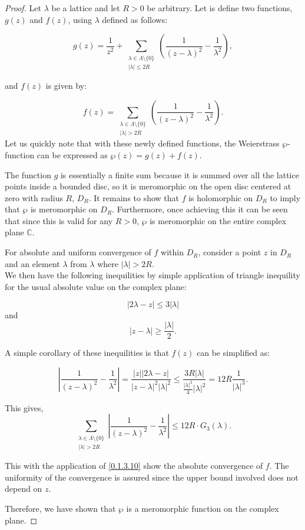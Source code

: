 \begin{proof}

Let $\lambda$ be a lattice and let \( R >0 \) be arbitrary. Let is define two functions, \( g(z) \) and \( f(z) \), using \( \lambda \) defined as follows:

\[
g(z) = \frac{1}{z^2} + \sum_{\substack{\lambda \in \Lambda \setminus \{0\} \\ |\lambda| \leq 2R}} \left( \frac{1}{(z - \lambda)^2} - \frac{1}{\lambda^2} \right),
\]

and \( f(z) \) is given by:

\[
f(z) = \sum_{\substack{\lambda \in \Lambda \setminus \{0\} \\ |\lambda| > 2R}} \left( \frac{1}{(z - \lambda)^2} - \frac{1}{\lambda^2} \right).
\]
Let us quickly note that with these newly defined functions, the Weierstrass \( \wp \)-function can be expressed as \( \wp(z) = g(z) + f(z) \).

The function \( g \) is essentially a finite sum because it is summed over all the lattice points inside a bounded disc, so it is meromorphic on the open disc centered at zero with radius \( R \), \( D_R \).
It remains to show that \( f \) is holomorphic on \( D_R \) to imply that \( \wp \) is meromorphic on \( D_R \). Furthermore, once achieving this it can be seen that since this is valid for any \( R > 0 \), \( \wp \) is meromorphic on the entire complex plane \( \mathbb{C} \).

For absolute and uniform convergence of \( f \) within \( D_R \), consider a point \( z \) in \( D_R \) and an element \( \lambda \) from \( \lambda \) where \( |\lambda| > 2R \). \\

We then have the following inequilities by simple application of triangle inequility for the usual absolute value on the complex plane: 

\[
|2\lambda - z| \leq 3|\lambda|
\]
and
\[
|z - \lambda| \geq \frac{|\lambda|}{2}.
\]

A simple corollary of these inequilities is that \( f(z) \) can be simplified as:

\[
\left|\frac{1}{(z - \lambda)^2} - \frac{1}{\lambda^2}\right| = \frac{|z||2 \lambda - z|}{|z - \lambda|^2|\lambda|^2} \leq \frac{3R|\lambda|}{\frac{|\lambda|^2}{4}|\lambda|^2} = 12R\frac{1}{|\lambda|^3}.
\]

This gives,
\[
\sum_{\substack{\lambda \in \Lambda \setminus \{0\} \\ |\lambda| > 2R}} \left|\frac{1}{(z - \lambda)^2} - \frac{1}{\lambda^2}\right| \leq 12R \cdot G_3(\lambda).
\]

This with the application of \ref{0.1.3.10} show the absolute convergence of \( f \). The uniformity of the convergence is assured since the upper bound involved does not depend on \( z \).

Therefore, we have shown that \( \wp \) is a meromorphic function on the complex plane.
\end{proof}

